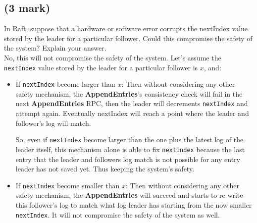 \documentclass[11pt]{article}
\begin{document}
\newpage
\subsection{(3 mark)}
In Raft, suppose that a hardware or software error corrupts the nextIndex value stored by the leader for a particular follower. Could this compromise the safety of the system? Explain your answer.\\

No, this will not compromise the safety of the system. Let's assume the \texttt{nextIndex} value stored by the leader for a particular follower is $x$, and:
\begin{itemize}
	\item If \texttt{nextIndex} become larger than $x$:
	\subitem Then without considering any other safety mechanism, the \textbf{AppendEntries}'s consistency check will fail in the next \textbf{AppendEntries} RPC, then the leader will decrements \texttt{nextIndex} and attempt again. Eventually nextIndex will reach a point where the leader and follower's log will match.
	
	So, even if \texttt{nextIndex} become larger than the one plus the latest log of the leader itself, this mechanism alone is able to fix \texttt{nextIndex} because the last entry that the leader and followers log match is not possible for any entry leader has not saved yet. Thus keeping the system's safety.

	\item If \texttt{nextIndex} become smaller than $x$:
	\subitem Then without considering any other safety mechanism, the \textbf{AppendEntries} will succeed and starts to re-write this follower's log to match what log leader has starting from the now smaller \texttt{nextIndex}. It will not compromise the safety of the system as well.


\end{itemize}

\newpage
\end{document}
